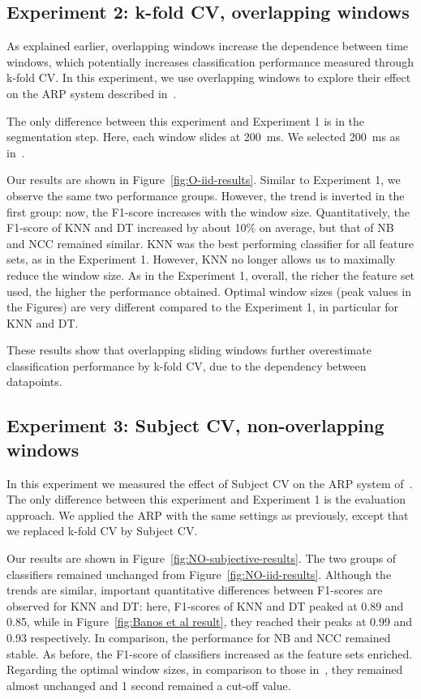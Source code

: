 \documentclass[sigconf]{acmart}
\begin{document}
    \subsection{Experiment 2: k-fold CV, overlapping windows} \label{subsec:classic-O}
   
    As explained earlier, overlapping windows increase the dependence between time windows, which potentially increases classification performance measured through k-fold CV. In this experiment, we use overlapping windows to explore their effect on the ARP system described in~\cite{banos2014window}.
    
     The only difference between this experiment and Experiment 1 is in the segmentation step. Here, each window slides at 200~ms. We selected 200~ms as in~\cite{morris2014recofit}.
     
     Our results are shown in Figure~\ref{fig:O-iid-results}. Similar to  Experiment 1, we observe the same two performance groups. However, the trend is inverted in the first group: now, the F1-score increases with the window size. Quantitatively, the F1-score of KNN and DT increased by about 10\% on average, but that of NB and NCC remained similar. KNN was the best performing classifier for all feature sets, as in the Experiment 1. However, KNN no longer allows us to maximally reduce the window size. As in the Experiment 1, overall, the richer the feature set used, the higher the performance obtained. Optimal window sizes (peak values in the Figures) are very different compared to the Experiment 1, in particular for KNN and DT.
     
     These results show that overlapping sliding windows further overestimate classification performance by k-fold CV, due to the dependency between datapoints. 


\subsection{Experiment 3: Subject CV, non-overlapping windows}

    In this experiment we measured the effect of Subject CV on the ARP system of~\cite{banos2014window}. 
    The only difference between this experiment and Experiment 1 is the evaluation approach. We applied the ARP with the same settings as previously, except that we replaced k-fold CV by Subject CV.
    
    Our results are shown in Figure~\ref{fig:NO-subjective-results}. The two groups of classifiers remained unchanged from Figure~\ref{fig:NO-iid-results}. Although the trends are similar, important quantitative differences between F1-scores are observed for KNN and DT: here, F1-scores of KNN and DT peaked at 0.89 and 0.85, while in Figure~\ref{fig:Banos et al result}, they reached their peaks at 0.99 and 0.93 respectively. In comparison, the performance for NB and NCC remained stable. As before, the F1-score of classifiers increased as the feature sets enriched. Regarding the optimal window sizes, in comparison to those in~\cite{banos2014window}, they remained almost unchanged and 1 second remained a cut-off value.
    
\end{document}
